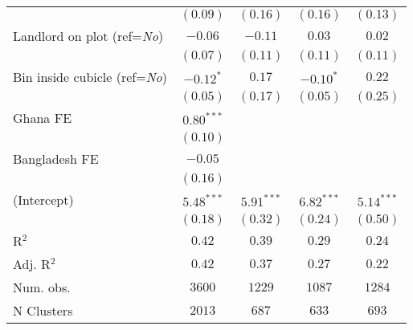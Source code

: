 \begin{center}
\begin{footnotesize}
\begin{ThreePartTable}
\begin{longtable}{l@{} c@{} c@{} c@{} c@{}}
                                                           & $(0.09)$      & $(0.16)$      & $(0.16)$      & $(0.13)$     \\
Landlord on plot (ref=\textit{No})                         & $-0.06$       & $-0.11$       & $0.03$        & $0.02$       \\
                                                           & $(0.07)$      & $(0.11)$      & $(0.11)$      & $(0.11)$     \\
Bin inside cubicle (ref=\textit{No})                       & $-0.12^{*}$   & $0.17$        & $-0.10^{*}$   & $0.22$       \\
                                                           & $(0.05)$      & $(0.17)$      & $(0.05)$      & $(0.25)$     \\
Ghana FE                                                   & $0.80^{***}$  &               &               &              \\
                                                           & $(0.10)$      &               &               &              \\
Bangladesh FE                                              & $-0.05$       &               &               &              \\
                                                           & $(0.16)$      &               &               &              \\
(Intercept)                                                & $5.48^{***}$  & $5.91^{***}$  & $6.82^{***}$  & $5.14^{***}$ \\
                                                           & $(0.18)$      & $(0.32)$      & $(0.24)$      & $(0.50)$     \\
\midrule
R$^2$                                                      & $0.42$        & $0.39$        & $0.29$        & $0.24$       \\
Adj. R$^2$                                                 & $0.42$        & $0.37$        & $0.27$        & $0.22$       \\
Num. obs.                                                  & $3600$        & $1229$        & $1087$        & $1284$       \\
N Clusters                                                 & $2013$        & $687$         & $633$         & $693$        \\
\end{longtable}
\end{ThreePartTable}
\end{footnotesize}
\end{center}
